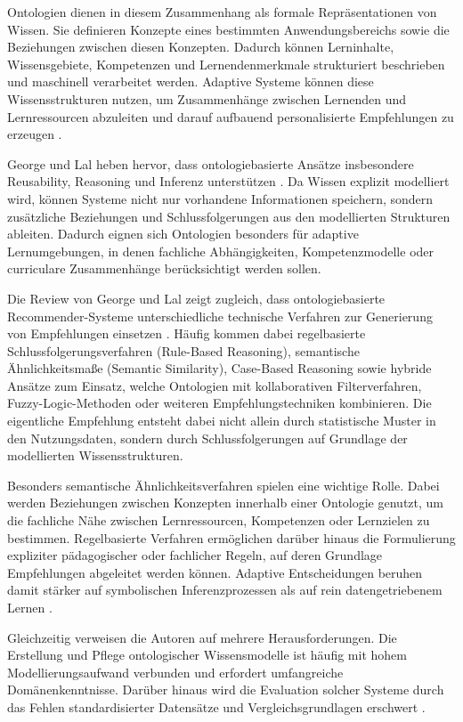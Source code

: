 Ontologien dienen in diesem Zusammenhang als formale Repräsentationen
von Wissen. Sie definieren Konzepte eines bestimmten Anwendungsbereichs
sowie die Beziehungen zwischen diesen Konzepten. Dadurch können
Lerninhalte, Wissensgebiete, Kompetenzen und Lernendenmerkmale
strukturiert beschrieben und maschinell verarbeitet werden. Adaptive
Systeme können diese Wissensstrukturen nutzen, um Zusammenhänge zwischen
Lernenden und Lernressourcen abzuleiten und darauf aufbauend
personalisierte Empfehlungen zu erzeugen \citep{George2019}.

George und Lal heben hervor, dass ontologiebasierte Ansätze insbesondere
Reusability, Reasoning und Inferenz unterstützen \citep{George2019}. Da
Wissen explizit modelliert wird, können Systeme nicht nur vorhandene
Informationen speichern, sondern zusätzliche Beziehungen und
Schlussfolgerungen aus den modellierten Strukturen ableiten. Dadurch
eignen sich Ontologien besonders für adaptive Lernumgebungen, in denen
fachliche Abhängigkeiten, Kompetenzmodelle oder curriculare
Zusammenhänge berücksichtigt werden sollen.

Die Review von George und Lal zeigt zugleich, dass ontologiebasierte
Recommender-Systeme unterschiedliche technische Verfahren zur
Generierung von Empfehlungen einsetzen \citep{George2019}. Häufig kommen
dabei regelbasierte Schlussfolgerungsverfahren (Rule-Based Reasoning),
semantische Ähnlichkeitsmaße (Semantic Similarity), Case-Based Reasoning
sowie hybride Ansätze zum Einsatz, welche Ontologien mit kollaborativen
Filterverfahren, Fuzzy-Logic-Methoden oder weiteren Empfehlungstechniken
kombinieren. Die eigentliche Empfehlung entsteht dabei nicht allein
durch statistische Muster in den Nutzungsdaten, sondern durch
Schlussfolgerungen auf Grundlage der modellierten Wissensstrukturen.

Besonders semantische Ähnlichkeitsverfahren spielen eine wichtige Rolle.
Dabei werden Beziehungen zwischen Konzepten innerhalb einer Ontologie
genutzt, um die fachliche Nähe zwischen Lernressourcen, Kompetenzen oder
Lernzielen zu bestimmen. Regelbasierte Verfahren ermöglichen darüber
hinaus die Formulierung expliziter pädagogischer oder fachlicher Regeln,
auf deren Grundlage Empfehlungen abgeleitet werden können. Adaptive
Entscheidungen beruhen damit stärker auf symbolischen Inferenzprozessen
als auf rein datengetriebenem Lernen \citep{George2019}.

Gleichzeitig verweisen die Autoren auf mehrere Herausforderungen. Die
Erstellung und Pflege ontologischer Wissensmodelle ist häufig mit hohem
Modellierungsaufwand verbunden und erfordert umfangreiche
Domänenkenntnisse. Darüber hinaus wird die Evaluation solcher Systeme
durch das Fehlen standardisierter Datensätze und Vergleichsgrundlagen
erschwert \citep{George2019}.


